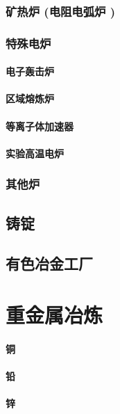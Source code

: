 \documentclass[UTF8]{../../ApplicationUniverse}
\begin{document}
    \subsection{矿热炉 (电阻电弧炉 )}
    \subsection{特殊电炉}
        \subsubsection{电子轰击炉}
        \subsubsection{区域熔炼炉}
        \subsubsection{等离子体加速器}
        \subsubsection{实验高温电炉}
    \subsection{其他炉}
\section{铸锭}
\section{有色冶金工厂}









\chapter{重金属冶炼}
\subsubsection{铜}
\subsubsection{铅}
\subsubsection{锌}
\end{document}
